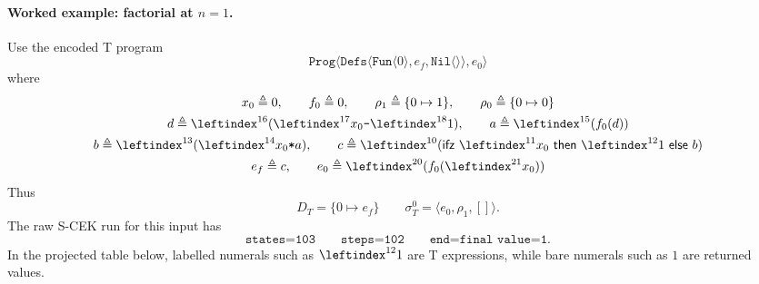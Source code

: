\documentclass[11pt]{article}
\begin{document}
\paragraph{Worked example: factorial at $n=1$.}
Use the encoded T program
\[
  \texttt{Prog}\langle
    \texttt{Defs}\langle \texttt{Fun}\langle 0\rangle, e_f, \texttt{Nil}\langle\rangle\rangle,
    e_0
  \rangle
\]
where
\[
\begin{gathered}
  x_0 \triangleq 0,\qquad f_0 \triangleq 0,\qquad
  \rho_1 \triangleq \{0\mapsto 1\},\qquad
  \rho_0 \triangleq \{0\mapsto 0\} \\
  d \triangleq \leftindex^{16}(\leftindex^{17}x_0 \texttt{-} \leftindex^{18}1),\qquad
  a \triangleq \leftindex^{15}(f_0(d)) \\
  b \triangleq \leftindex^{13}(\leftindex^{14}x_0 \texttt{*} a),\qquad
  c \triangleq \leftindex^{10}(\mathsf{ifz}\ \leftindex^{11}x_0\ \mathsf{then}\ \leftindex^{12}1\ \mathsf{else}\ b) \\
  e_f \triangleq c,\qquad
  e_0 \triangleq \leftindex^{20}(f_0(\leftindex^{21}x_0))
\end{gathered}
\]
Thus
\[
  D_T = \{0\mapsto e_f\}
  \qquad
  \sigma_T^0 = \langle e_0,\rho_1,[]\rangle.
\]
The raw S-CEK run for this input has
\[
  \texttt{states=103}
  \qquad
  \texttt{steps=102}
  \qquad
  \texttt{end=final value=1}.
\]
In the projected table below, labelled numerals such as $\leftindex^{12}1$ are T expressions, while bare numerals such as $1$ are returned values.
\end{document}
